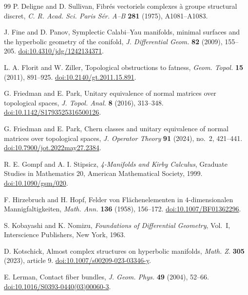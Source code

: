 \documentclass[11pt]{amsart}
\theoremstyle{plain}
\theoremstyle{definition}
\theoremstyle{remark}
\begin{document}
\begin{thebibliography}{99}
P. Deligne and D. Sullivan, Fibr\'es vectoriels complexes \`a groupe
structural discret, \emph{C. R. Acad. Sci. Paris S\'er. A--B}
\textbf{281} (1975), A1081--A1083.

J. Fine and D. Panov, Symplectic Calabi--Yau manifolds, minimal surfaces
and the hyperbolic geometry of the conifold,
\emph{J. Differential Geom.} \textbf{82} (2009), 155--205.
\href{https://doi.org/10.4310/jdg/1242134371}{doi:10.4310/jdg/1242134371}.

L. A. Florit and W. Ziller, Topological obstructions to fatness,
\emph{Geom. Topol.} \textbf{15} (2011), 891--925.
\href{https://doi.org/10.2140/gt.2011.15.891}{doi:10.2140/gt.2011.15.891}.

G. Friedman and E. Park, Unitary equivalence of normal matrices over
topological spaces, \emph{J. Topol. Anal.} \textbf{8} (2016), 313--348.
\href{https://doi.org/10.1142/S1793525316500126}{doi:10.1142/S1793525316500126}.

G. Friedman and E. Park, Chern classes and unitary equivalence of normal
matrices over topological spaces, \emph{J. Operator Theory} \textbf{91}
(2024), no.~2, 421--441.
\href{https://doi.org/10.7900/jot.2022may27.2384}{doi:10.7900/jot.2022may27.2384}.

R. E. Gompf and A. I. Stipsicz, \emph{4-Manifolds and Kirby Calculus},
Graduate Studies in Mathematics 20, American Mathematical Society, 1999.
\href{https://doi.org/10.1090/gsm/020}{doi:10.1090/gsm/020}.

F. Hirzebruch and H. Hopf, Felder von Fl\"achenelementen in
$4$-dimensionalen Mannigfaltigkeiten, \emph{Math. Ann.}
\textbf{136} (1958), 156--172.
\href{https://doi.org/10.1007/BF01362296}{doi:10.1007/BF01362296}.

S. Kobayashi and K. Nomizu, \emph{Foundations of Differential Geometry}, Vol.~I,
Interscience Publishers, New York, 1963.

D. Kotschick, Almost complex structures on hyperbolic manifolds,
\emph{Math. Z.} \textbf{305} (2023), article 9.
\href{https://doi.org/10.1007/s00209-023-03346-y}{doi:10.1007/s00209-023-03346-y}.

E. Lerman, Contact fiber bundles,
\emph{J. Geom. Phys.} \textbf{49} (2004), 52--66.
\href{https://doi.org/10.1016/S0393-0440(03)00060-3}{doi:10.1016/S0393-0440(03)00060-3}.


\end{thebibliography}
\end{document}
